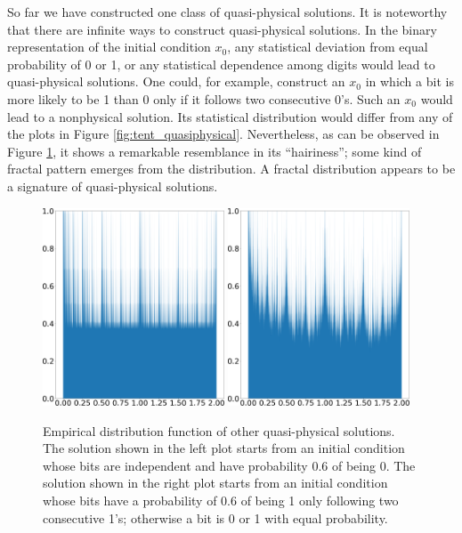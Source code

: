 \documentclass[preprint,12pt]{elsarticle}
\begin{document}
So far we have constructed one class of quasi-physical solutions.
It is noteworthy that there are infinite ways to 
construct quasi-physical solutions.  In the binary representation 
of the initial condition $x_0$, any statistical
deviation from equal probability of 0 or 1, or any statistical
dependence among digits would lead to quasi-physical solutions.
One could, for example, construct an $x_0$ in which a bit is
more likely to be 1 than 0 only if it follows two consecutive 0's.
Such an $x_0$ would lead to a nonphysical solution.  Its statistical
distribution would differ from any of the plots in Figure
\ref{fig:tent_quasiphysical}.  Nevertheless, as can be
observed in Figure \ref{fig:tent_alternative}, it shows
a remarkable resemblance in its ``hairiness''; some kind of fractal
pattern emerges from the distribution.  A fractal distribution
appears to be a signature of quasi-physical solutions.
\begin{figure}\centering
    \centering
    \includegraphics[width=0.48\textwidth]{tent_quasiphysical_alternaive1_hist_p_0.6.png}
    \hspace{0.02\textwidth}
    \includegraphics[width=0.48\textwidth]{tent_quasiphysical_alternaive2_hist_p_0.6.png}
    \caption{Empirical distribution function of other quasi-physical solutions.
    The solution shown in the left plot starts from an initial condition
    whose bits are independent and have probability 0.6 of being 0.
    The solution shown in the right plot starts from an initial condition
    whose bits have a probability of 0.6 of being 1 only following two
    consecutive 1's; otherwise a bit is 0 or 1 with equal probability.}
    \label{fig:tent_alternative}
\end{figure}
\end{document}
